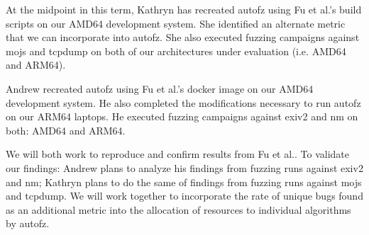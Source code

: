 At the midpoint in this term, Kathryn has recreated autofz using Fu et al.\cite{Fu}'s build scripts 
on our AMD64 development system. She identified an alternate metric that we can incorporate into 
autofz. She also executed fuzzing campaigns against mojs and tcpdump on both of our architectures 
under evaluation (i.e. AMD64 and ARM64). 

Andrew recreated autofz using Fu et al.\cite{Fu}'s docker image on our AMD64 development system. 
He also completed the modifications necessary to run autofz on our ARM64 laptops. He executed fuzzing 
campaigns against exiv2 and nm on both: AMD64 and ARM64.

We will both work to reproduce and confirm results from Fu et al.\cite{Fu}. To validate our findings: 
Andrew plans to analyze his findings from fuzzing runs against exiv2 and nm; Kathryn plans to do the 
same of findings from fuzzing runs against mojs and tcpdump. We will work together to incorporate 
the rate of unique bugs found as an additional metric into the allocation of resources to individual 
algorithms by autofz.



    





